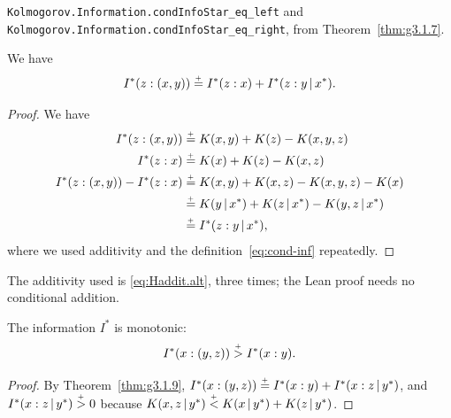 \begin{formalization}
\texttt{Kolmogorov.Information.condInfoStar\_eq\_left} and
\texttt{Kolmogorov.Information.condInfoStar\_eq\_right}, from Theorem~\ref{thm:g3.1.7}.
\end{formalization}

 \begin{theorem}
  \label{thm:g3.1.9}
  \leanok
 We have
 \begin{equation}\label{eq:alg-data-proc-ident}
   I^{*}(z : (x, y)) \stackrel{{}_+}{=} I^{*}(z : x) + I^{*}(z : y \,\vert\, x^{*}).
 \end{equation}
 \end{theorem}

 \begin{proof}
  \leanok
We have
 \begin{align*}
    I^{*}(z : (x, y)) &\stackrel{{}_+}{=} K(x, y) + K(z) - K(x, y, z)
\\  I^{*}(z : x)      &\stackrel{{}_+}{=} K(x)    + K(z) - K(x, z)
\\ I^{*}(z : (x, y)) - I^{*}(z : x) 
            &\stackrel{{}_+}{=} K(x, y) + K(x, z) - K(x, y, z) - K(x)
\\          &\stackrel{{}_+}{=} K(y \,\vert\, x^{*}) + K(z \,\vert\, x^{*}) - K(y, z \,\vert\, x^{*})
\\          &\stackrel{{}_+}{=} I^{*}(z : y \,\vert\, x^{*}),
 \end{align*}
where we used additivity and the definition~\eqref{eq:cond-inf} repeatedly.
 \end{proof}

\begin{formalization}
The additivity used is \eqref{eq:Haddit.alt}, three times; the Lean proof needs no
conditional addition.
\end{formalization}

 \begin{corollary}
  \label{cor:g3.1.15}
  \leanok
The information \( I^{*} \) is monotonic:
 \begin{equation}\label{eq:inf-mon}
   I^{*}(x : (y, z)) \stackrel{{}_+}{>} I^{*}(x : y).
 \end{equation}
  \end{corollary}

\begin{proof}
  \leanok
By Theorem~\ref{thm:g3.1.9}, \( I^{*}(x : (y, z)) \stackrel{{}_+}{=} I^{*}(x : y) + I^{*}(x : z \,\vert\, y^{*}) \),
and \( I^{*}(x : z \,\vert\, y^{*}) \stackrel{{}_+}{>} 0 \) because
\( K(x, z \,\vert\, y^{*}) \stackrel{{}_+}{<} K(x \,\vert\, y^{*}) + K(z \,\vert\, y^{*}) \).
\end{proof}

